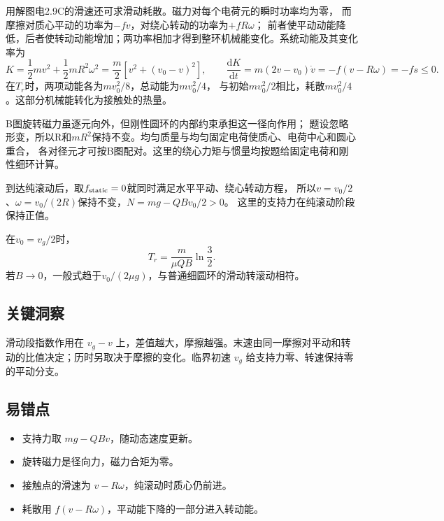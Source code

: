\documentclass[UTF8,fontset=fandol,a4paper,11pt]{ctexart}
\newcommand{\result}[1]{\begin{equation*}\boxed{#1}\end{equation*}}
\begin{document}
用解图电2.9C的滑速还可求滑动耗散。磁力对每个电荷元的瞬时功率均为零，
而摩擦对质心平动的功率为$-fv$，对绕心转动的功率为$+fR\omega$；
前者使平动动能降低，后者使转动动能增加；两功率相加才得到整环机械能变化。系统动能及其变化率为
\[
K=\frac12mv^2+\frac12mR^2\omega^2
=\frac m2[v^2+(v_0-v)^2],\qquad
\frac{\mathrm dK}{\mathrm dt}
=m(2v-v_0)\dot v=-f(v-R\omega)=-fs\le0.
\]
在$T_r$时，两项动能各为$mv_0^2/8$，总动能为$mv_0^2/4$，
与初始$mv_0^2/2$相比，耗散$mv_0^2/4$。这部分机械能转化为接触处的热量。

B图旋转磁力虽逐元向外，但刚性圆环的内部约束承担这一径向作用；
题设忽略形变，所以R和$mR^2$保持不变。均匀质量与均匀固定电荷使质心、电荷中心和圆心重合，
各对径元才可按B图配对。这里的绕心力矩与惯量均按题给固定电荷和刚性细环计算。

到达纯滚动后，取$f_{\rm static}=0$就同时满足水平平动、绕心转动方程，
所以$v=v_0/2$、$\omega=v_0/(2R)$保持不变，$N=mg-QBv_0/2>0$。
这里的支持力在纯滚动阶段保持正值。

在$v_0=v_g/2$时，
\result{T_r=\frac m{\mu QB}\ln\frac32.}
若$B\to0$，一般式趋于$v_0/(2\mu g)$，与普通细圆环的滑动转滚动相符。



\subsection*{关键洞察}

滑动段指数作用在 $v_g-v$ 上，差值越大，摩擦越强。末速由同一摩擦对平动和转动的比值决定；历时另取决于摩擦的变化。临界初速 $v_g$ 给支持力零、转速保持零的平动分支。



\subsection*{易错点}

\begin{itemize}
\item 支持力取 $mg-QBv$，随动态速度更新。
\item 旋转磁力是径向力，磁力合矩为零。
\item 接触点的滑速为 $v-R\omega$，纯滚动时质心仍前进。
\item 耗散用 $f(v-R\omega)$，平动能下降的一部分进入转动能。
\end{itemize}
\end{document}
